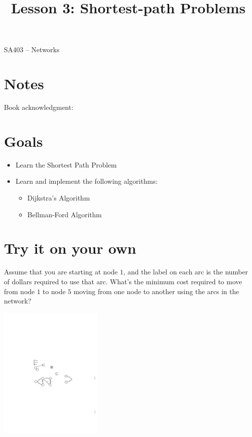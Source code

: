 \documentclass[12pt]{article}
\makeatletter
\theoremstyle{definition}
\newcommand{\graphbox}[5]%
{
\begin{tikzpicture}
     [>=latex,scale=#5]
     
     \draw [->,very thick] (#1, 0) -- (#2, 0) node[right] {$x$};
     \draw [->,very thick] (0, #3) -- (0, #4) node[above] {$y$};
     
     \draw[step=1cm,thick,dotted] (#1,#3) grid (#2,#4);
   \end{tikzpicture}
   }
\renewcommand{\maketitle}{
  \noindent SA403 -- Networks \\

  \begin{center}\Large{\textbf{\@title}}\end{center}
}
\makeatother
\begin{document}

\title{Lesson 3: Shortest-path Problems}


\maketitle


\section*{Notes}

Book acknowledgment:
\section*{Goals}
\begin{itemize}
	\item Learn the Shortest Path Problem
	\item Learn and implement the following algorithms:
	\begin{itemize}
		\item Dijkstra's Algorithm
		\item Bellman-Ford Algorithm
	\end{itemize}
\end{itemize}




\section{Try it on your own}

Assume that you are starting at node $1$, and the label on each arc is the number of dollars required to use that arc. What's the minimum cost required to move from node $1$ to node $5$ moving from one node to another using the arcs in the network?

\begin{center}
\includegraphics[width=5cm]{shortestpathexample1}
\end{center}
\end{document}
